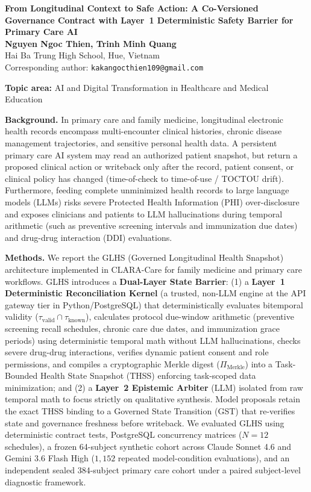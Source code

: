 \documentclass[11pt]{article}
\begin{document}
\begin{center}
{\Large\bfseries From Longitudinal Context to Safe Action: A Co-Versioned Governance Contract with Layer~1 Deterministic Safety Barrier for Primary Care AI}\\[0.7em]
\textbf{Nguyen Ngoc Thien, Trinh Minh Quang}\\
Hai Ba Trung High School, Hue, Vietnam\\
Corresponding author: \texttt{kakangocthien109@gmail.com}
\end{center}
\textbf{Topic area:} AI and Digital Transformation in Healthcare and Medical Education

\textbf{Background.} In primary care and family medicine, longitudinal electronic health records encompass multi-encounter clinical histories, chronic disease management trajectories, and sensitive personal health data. A persistent primary care AI system may read an authorized patient snapshot, but return a proposed clinical action or writeback only after the record, patient consent, or clinical policy has changed (time-of-check to time-of-use / TOCTOU drift). Furthermore, feeding complete unminimized health records to large language models (LLMs) risks severe Protected Health Information (PHI) over-disclosure and exposes clinicians and patients to LLM hallucinations during temporal arithmetic (such as preventive screening intervals and immunization due dates) and drug-drug interaction (DDI) evaluations.

\textbf{Methods.} We report the GLHS (Governed Longitudinal Health Snapshot) architecture implemented in CLARA-Care for family medicine and primary care workflows. GLHS introduces a \textbf{Dual-Layer State Barrier}: (1) a \textbf{Layer~1 Deterministic Reconciliation Kernel} (a trusted, non-LLM engine at the API gateway tier in Python/PostgreSQL) that deterministically evaluates bitemporal validity ($\tau_{\text{valid}} \cap \tau_{\text{known}}$), calculates protocol due-window arithmetic (preventive screening recall schedules, chronic care due dates, and immunization grace periods) using deterministic temporal math without LLM hallucinations, checks severe drug-drug interactions, verifies dynamic patient consent and role permissions, and compiles a cryptographic Merkle digest ($\Pi_{\text{Merkle}}$) into a Task-Bounded Health State Snapshot (THSS) enforcing task-scoped data minimization; and (2) a \textbf{Layer~2 Epistemic Arbiter} (LLM) isolated from raw temporal math to focus strictly on qualitative synthesis. Model proposals retain the exact THSS binding to a Governed State Transition (GST) that re-verifies state and governance freshness before writeback. We evaluated GLHS using deterministic contract tests, PostgreSQL concurrency matrices ($N=12$ schedules), a frozen 64-subject synthetic cohort across Claude Sonnet 4.6 and Gemini 3.6 Flash High ($1{,}152$ repeated model-condition evaluations), and an independent sealed 384-subject primary care cohort under a paired subject-level diagnostic framework.
\end{document}
